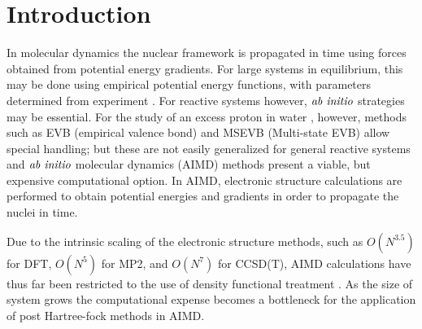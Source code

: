 \chapter{Introduction}

In molecular dynamics the nuclear framework is propagated in time using forces obtained
from potential energy gradients. For large systems in equilibrium, this may be done
using empirical potential energy functions, with parameters determined from experiment
\cite{Allen, Ciccotti, Haberlandt, Frenkel, Binder, Berne, Esser}. For reactive systems
however, $\it{ab~ initio}$ strategies may be essential. For the study of an excess proton
in water \cite{James, VothDay, IyengarPetersen, fragAIMD-elbo, fragAIMD-CC,fragAIMD},
however, methods such as \cite{polarizability1, polarizability2, aqc} EVB
(empirical valence bond) and MSEVB (Multi-state EVB) \cite{VothDay} allow special
handling; but these are not easily generalized for general reactive systems and
$\it{ab~ initio}$ molecular dynamics (AIMD) methods present a viable, but expensive
computational option. In AIMD, electronic structure calculations are performed to obtain
potential energies and gradients in order to propagate the nuclei in time.

Due to the intrinsic scaling of the electronic structure methods, such as 
$O(N^{3.5})$ for DFT, $O(N^5)$ for MP2, and $O(N^7)$ for CCSD(T), AIMD calculations
have thus far been restricted to the use of density functional treatment 
\cite{Jutter-2D-MOFs-on-water-DFT-AIMD,Gerber-AIMD-atmospheric-2,Gerber-AIMD-atmospheric,
Hutter-Review,Kirchner-Hutter-Aimd-Apps}. As the size of system grows the computational
expense becomes a bottleneck for the application of post Hartree-fock methods in AIMD.

